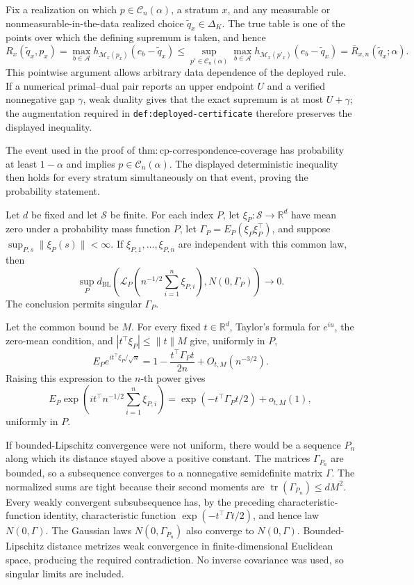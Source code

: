 Fix a realization on which \(p\in\mathcal C_n(\alpha)\), a stratum \(x\), and any measurable or nonmeasurable-in-the-data realized choice \(\widetilde q_x\in\Delta_K\).  The true table is one of the points over which the defining supremum is taken, and hence
\[
 R_x(\widetilde q_x,p_x)
 =\max_{b\in\mathcal A}h_{\mathcal M_x(p_x)}(e_b-\widetilde q_x)
 \leq\sup_{p'\in\mathcal C_n(\alpha)}\max_{b\in\mathcal A}h_{\mathcal M_x(p'_x)}(e_b-\widetilde q_x)
 =\overline R_{x,n}(\widetilde q_x;\alpha).
\]
This pointwise argument allows arbitrary data dependence of the deployed rule.  If a numerical primal--dual pair reports an upper endpoint \(U\) and a verified nonnegative gap \(\gamma\), weak duality gives that the exact supremum is at most \(U+\gamma\); the augmentation required in \texttt{def:deployed-certificate} therefore preserves the displayed inequality.

The event used in the proof of \(\mathrm{thm{:}cp\text{-}correspondence\text{-}coverage}\) has probability at least \(1-\alpha\) and implies \(p\in\mathcal C_n(\alpha)\).  The displayed deterministic inequality then holds for every stratum simultaneously on that event, proving the probability statement.

Let \(d\) be fixed and let \(\mathcal S\) be finite.  For each index \(P\), let \(\xi_P:\mathcal S\to\mathbb R^d\) have mean zero under a probability mass function \(P\), let \(\Gamma_P=E_P(\xi_P\xi_P^\top)\), and suppose \(\sup_{P,s}\|\xi_P(s)\|<\infty\).  If \(\xi_{P,1},\ldots,\xi_{P,n}\) are independent with this common law, then
\[
 \sup_P d_{\mathrm{BL}}\left(\mathcal L_P\left(n^{-1/2}\sum_{i=1}^n\xi_{P,i}\right),N(0,\Gamma_P)\right)\longrightarrow0.
\]
The conclusion permits singular \(\Gamma_P\).

Let the common bound be \(M\).  For every fixed \(t\in\mathbb R^d\), Taylor's formula for \(e^{iu}\), the zero-mean condition, and \(|t^\top\xi_P|\leq\|t\|M\) give, uniformly in \(P\),
\[
 E_Pe^{it^\top\xi_P/\sqrt n}
 =1-\frac{t^\top\Gamma_Pt}{2n}+O_{t,M}(n^{-3/2}).
\]
Raising this expression to the \(n\)-th power gives
\[
 E_P\exp\left(it^\top n^{-1/2}\sum_{i=1}^n\xi_{P,i}\right)
 =\exp(-t^\top\Gamma_Pt/2)+o_{t,M}(1),
\]
uniformly in \(P\).

If bounded-Lipschitz convergence were not uniform, there would be a sequence \(P_n\) along which its distance stayed above a positive constant.  The matrices \(\Gamma_{P_n}\) are bounded, so a subsequence converges to a nonnegative semidefinite matrix \(\Gamma\).  The normalized sums are tight because their second moments are \(\operatorname{tr}(\Gamma_{P_n})\leq dM^2\).  Every weakly convergent subsubsequence has, by the preceding characteristic-function identity, characteristic function \(\exp(-t^\top\Gamma t/2)\), and hence law \(N(0,\Gamma)\).  The Gaussian laws \(N(0,\Gamma_{P_n})\) also converge to \(N(0,\Gamma)\).  Bounded-Lipschitz distance metrizes weak convergence in finite-dimensional Euclidean space, producing the required contradiction.  No inverse covariance was used, so singular limits are included.

